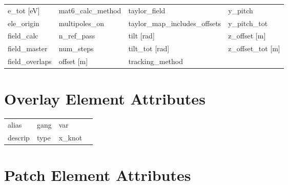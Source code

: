 \begin{tabular}{llll}
e_tot [eV]                     & mat6_calc_method               & taylor_field                   & y_pitch                        \\
ele_origin                     & multipoles_on                  & taylor_map_includes_offsets    & y_pitch_tot                    \\
field_calc                     & n_ref_pass                     & tilt [rad]                     & z_offset [m]                   \\
field_master                   & num_steps                      & tilt_tot [rad]                 & z_offset_tot [m]               \\
field_overlaps                 & offset [m]                     & tracking_method                &                                \\
 \bottomrule
 \end{tabular}
 \vfill
 
 \section{Overlay Element Attributes}
 \label{s:list.overlay}
 
 \begin{tabular}{llll} \toprule
alias                          & gang                           & var                            &                                \\
descrip                        & type                           & x_knot                         &                                \\
 \bottomrule
 \end{tabular}
 \vfill
 
 \section{Patch Element Attributes}
 \label{s:list.patch}
 
